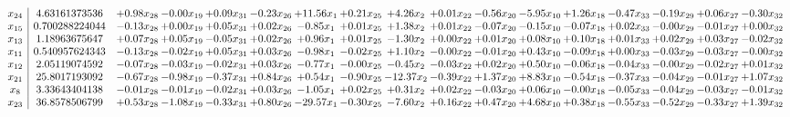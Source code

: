 \documentclass[9pt]{article}
\begin{document}
 \[\begin{array}{c| c c@{\hskip 2pt} c@{\hskip 2pt} c@{\hskip 2pt} c@{\hskip 2pt} c@{\hskip 2pt} c@{\hskip 2pt} c@{\hskip 2pt} c@{\hskip 2pt} c@{\hskip 2pt} c@{\hskip 2pt} c@{\hskip 2pt} c@{\hskip 2pt} c@{\hskip 2pt} c@{\hskip 2pt} c@{\hskip 2pt} }
 x_{24}   &  4.63161373536 & +  0.98 x_{28} & -0.00 x_{19} & +  0.09 x_{31} & -0.23 x_{26} & + 11.56 x_{1} & +  0.21 x_{25} & +  4.26 x_{2} & +  0.01 x_{22} & -0.56 x_{20} & -5.95 x_{10} & +  1.26 x_{18} & -0.47 x_{33} & -0.19 x_{29} & +  0.06 x_{27} & -0.30 x_{32}\\
 x_{15}   &  0.700288224044 & -0.13 x_{28} & +  0.00 x_{19} & +  0.05 x_{31} & +  0.02 x_{26} & -0.85 x_{1} & +  0.01 x_{25} & +  1.38 x_{2} & +  0.01 x_{22} & -0.07 x_{20} & -0.15 x_{10} & -0.07 x_{18} & +  0.02 x_{33} & -0.00 x_{29} & -0.01 x_{27} & +  0.00 x_{32}\\
 x_{13}   &  1.18963675647 & +  0.07 x_{28} & +  0.05 x_{19} & -0.05 x_{31} & +  0.02 x_{26} & +  0.96 x_{1} & +  0.01 x_{25} & -1.30 x_{2} & +  0.00 x_{22} & +  0.01 x_{20} & +  0.08 x_{10} & +  0.10 x_{18} & +  0.01 x_{33} & +  0.02 x_{29} & +  0.03 x_{27} & -0.02 x_{32}\\
 x_{11}   &  0.540957624343 & -0.13 x_{28} & -0.02 x_{19} & +  0.05 x_{31} & +  0.03 x_{26} & -0.98 x_{1} & -0.02 x_{25} & +  1.10 x_{2} & -0.00 x_{22} & -0.01 x_{20} & +  0.43 x_{10} & -0.09 x_{18} & +  0.00 x_{33} & -0.03 x_{29} & -0.03 x_{27} & -0.00 x_{32}\\
 x_{12}   &  2.05119074592 & -0.07 x_{28} & -0.03 x_{19} & -0.02 x_{31} & +  0.03 x_{26} & -0.77 x_{1} & -0.00 x_{25} & -0.45 x_{2} & -0.03 x_{22} & +  0.02 x_{20} & +  0.50 x_{10} & -0.06 x_{18} & -0.04 x_{33} & -0.00 x_{29} & -0.02 x_{27} & +  0.01 x_{32}\\
 x_{21}   &  25.8017193092 & -0.67 x_{28} & -0.98 x_{19} & -0.37 x_{31} & +  0.84 x_{26} & +  0.54 x_{1} & -0.90 x_{25} & -12.37 x_{2} & -0.39 x_{22} & +  1.37 x_{20} & +  8.83 x_{10} & -0.54 x_{18} & -0.37 x_{33} & -0.04 x_{29} & -0.01 x_{27} & +  1.07 x_{32}\\
 x_{8}   &  3.33643404138 & -0.01 x_{28} & -0.01 x_{19} & -0.02 x_{31} & +  0.03 x_{26} & -1.05 x_{1} & +  0.02 x_{25} & +  0.31 x_{2} & +  0.02 x_{22} & -0.03 x_{20} & +  0.06 x_{10} & -0.00 x_{18} & -0.05 x_{33} & -0.04 x_{29} & -0.03 x_{27} & -0.01 x_{32}\\
 x_{23}   &  36.8578506799 & +  0.53 x_{28} & -1.08 x_{19} & -0.33 x_{31} & +  0.80 x_{26} & -29.57 x_{1} & -0.30 x_{25} & -7.60 x_{2} & +  0.16 x_{22} & +  0.47 x_{20} & +  4.68 x_{10} & +  0.38 x_{18} & -0.55 x_{33} & -0.52 x_{29} & -0.33 x_{27} & +  1.39 x_{32}\\

\end{array}\]
\end{document}

